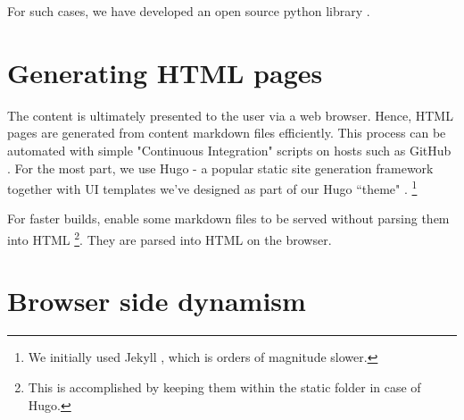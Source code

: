 \documentclass[11pt]{article}
\begin{document}
For such cases, we have developed an open source python library \cite{doc_curation}.

\section{Generating HTML pages}
The content is ultimately presented to the user via a web browser. Hence, HTML pages are generated from content markdown files efficiently. This process can be automated with simple "Continuous Integration" scripts on hosts such as GitHub \cite{vishvAsa_kalpAntaram_src}. For the most part, we use Hugo - a popular static site generation framework \cite{hugo} together with UI templates we've designed as part of our Hugo ``theme" \cite{sandoc_hugo}. \footnote{We initially used \cite{sandoc_jekyll} Jekyll \cite{jekyll}, which is orders of magnitude slower.}

For faster builds, enable some markdown files to be served without parsing them into HTML \footnote{This is accomplished by keeping them within the static folder in case of Hugo.}. They are parsed into HTML on the browser.

\section{Browser side dynamism}




\end{document}

